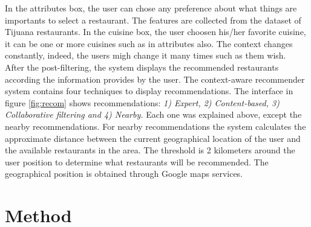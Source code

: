 In the attributes box, the user can chose any preference about what
things are importants to select a restaurant. The features are
collected from the dataset of Tijuana restaurants. In the cuisine box,
the user choosen his/her favorite cuisine, it can be one or more
cuisines such as in attributes  also.
The context changes constantly, indeed, the users migh change 
it many times such as them wish.\\ 
After the post-filtering, the system displays the  recommended
restaurants according the information provides by the user. The
context-aware recommender system contains four techniques to display
recommendations. The interface in figure \ref{fig:recom} shows
recommendations: \textit{1) Expert, 2) Content-based, 3) Collaborative
filtering and 4) Nearby.} Each one was explained above, except the
nearby recommendations. For nearby recommendations the system
calculates the approximate distance between the current geographical
location of the user and the available restaurants in the area.  The
threshold is 2 kilometers around the user position to determine what
restaurants will be recommended. The geographical position is
obtained through Google maps services.

\section{Method} 

